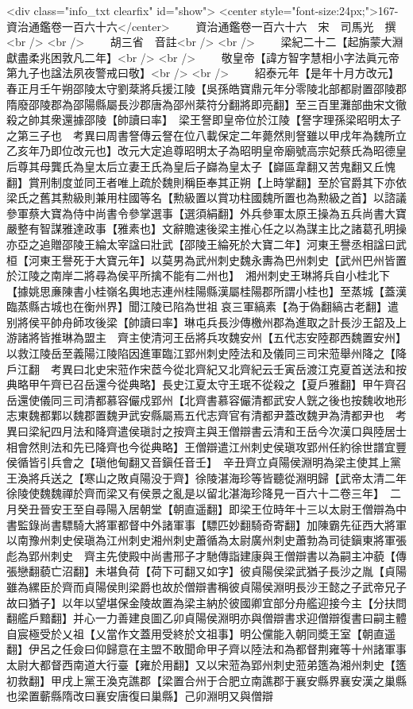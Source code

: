<div class="info_txt clearfix" id="show">
<center style="font-size:24px;">167-資治通鑑卷一百六十六</center>
  　　資治通鑑卷一百六十六　宋　司馬光　撰<br />
<br />
　　胡三省　音註<br />
<br />
　　梁紀二十二【起旃蒙大淵獻盡柔兆困敦凡二年】<br />
<br />
　　敬皇帝【諱方智字慧相小字法眞元帝第九子也諡法夙夜警戒曰敬】<br />
<br />
　　紹泰元年【是年十月方改元】春正月壬午朔邵陵太守劉棻將兵援江陵【吳孫皓寶鼎元年分零陵北部都尉置邵陵郡隋廢邵陵郡為邵陽縣屬長沙郡唐為邵州棻符分翻將即亮翻】至三百里灘部曲宋文徹殺之帥其衆還據邵陵【帥讀曰率】　梁王詧即皇帝位於江陵【詧字理孫梁昭明太子之第三子也　考異曰周書詧傳云詧在位八載保定二年薨然則詧雖以甲戌年為魏所立乙亥年乃即位改元也】改元大定追尊昭明太子為昭明皇帝廟號高宗妃蔡氏為昭德皇后尊其母龔氏為皇太后立妻王氏為皇后子巋為皇太子【巋區韋翻又苦鬼翻又丘愧翻】賞刑制度並同王者唯上疏於魏則稱臣奉其正朔【上時掌翻】至於官爵其下亦依梁氏之舊其勲級則兼用柱國等名【勲級置以賞功柱國魏所置也為勲級之首】以諮議參軍蔡大寶為侍中尚書令參掌選事【選須絹翻】外兵參軍太原王操為五兵尚書大寶嚴整有智謀雅達政事【雅素也】文辭贍速後梁主推心任之以為謀主比之諸葛孔明操亦亞之追贈邵陵王綸太宰諡曰壯武【邵陵王綸死於大寶二年】河東王譽丞相諡曰武桓【河東王譽死于大寶元年】以莫男為武州刺史魏永夀為巴州刺史【武州巴州皆置於江陵之南岸二將尋為侯平所擒不能有二州也】　湘州刺史王琳將兵自小桂北下【據姚思亷陳書小桂嶺名輿地志連州桂陽縣漢屬桂陽郡所謂小桂也】至蒸城【蓋漢臨蒸縣古城也在衡州界】聞江陵已陷為世祖哀三軍縞素【為于偽翻縞古老翻】遣别將侯平帥舟師攻後梁【帥讀曰率】琳屯兵長沙傳檄州郡為進取之計長沙王韶及上游諸將皆推琳為盟主　齊主使清河王岳將兵攻魏安州【五代志安陸郡西魏置安州】以救江陵岳至義陽江陵陷因進軍臨江郢州刺史陸法和及儀同三司宋蒞舉州降之【降戶江翻　考異曰北史宋蒞作宋茝今從北齊紀又北齊紀云壬寅岳渡江克夏首送法和按典略甲午齊已召岳還今從典略】長史江夏太守王珉不從殺之【夏戶雅翻】甲午齊召岳還使儀同三司清都慕容儼戍郢州【北齊書慕容儼清都武安人皝之後也按魏收地形志東魏都鄴以魏郡置魏尹武安縣屬焉五代志齊官有清都尹蓋改魏尹為清都尹也　考異曰梁紀四月法和降齊遣侯瑱討之按齊主與王僧辯書云清和王岳今次漢口與陸居士相會然則法和先已降齊也今從典略】王僧辯遣江州刺史侯瑱攻郢州任約徐世譜宜豐侯循皆引兵會之【瑱他甸翻又音鎭任音壬】　辛丑齊立貞陽侯淵明為梁主使其上黨王渙將兵送之【寒山之敗貞陽没于齊】徐陵湛海珍等皆聽從淵明歸【武帝太清二年徐陵使魏魏禪於齊而梁又有侯景之亂是以留北湛海珍降見一百六十二卷三年】　二月癸丑晉安王至自尋陽入居朝堂【朝直遥翻】即梁王位時年十三以太尉王僧辯為中書監錄尚書驃騎大將軍都督中外諸軍事【驃匹妙翻騎奇寄翻】加陳霸先征西大將軍以南豫州刺史侯瑱為江州刺史湘州刺史蕭循為太尉廣州刺史蕭勃為司徒鎭東將軍張彪為郢州刺史　齊主先使殿中尚書邢子才馳傳詣建康與王僧辯書以為嗣主冲藐【傳張戀翻藐亡沼翻】未堪負荷【荷下可翻又如字】彼貞陽侯梁武猶子長沙之胤【貞陽雖為縲臣於齊而貞陽侯則梁爵也故於僧辯書稱彼貞陽侯淵明長沙王懿之子武帝兄子故曰猶子】以年以望堪保金陵故置為梁主納於彼國卿宜部分舟艦迎接今主【分扶問翻艦戶黯翻】并心一力善建良圖乙卯貞陽侯淵明亦與僧辯書求迎僧辯復書曰嗣主體自宸極受於乂祖【乂當作文蓋用受終於文祖事】明公儻能入朝同奬王室【朝直遥翻】伊呂之任僉曰仰歸意在主盟不敢聞命甲子齊以陸法和為都督荆雍等十州諸軍事太尉大都督西南道大行臺【雍於用翻】又以宋蒞為郢州刺史蒞弟簉為湘州刺史【簉初救翻】甲戌上黨王渙克譙郡【梁置合州于合肥立南譙郡于襄安縣界襄安漢之巢縣也梁置蘄縣隋改曰襄安唐復曰巢縣】己卯淵明又與僧辯